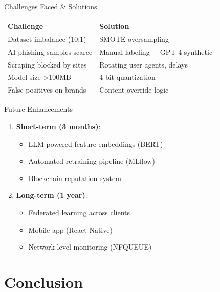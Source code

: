 \documentclass[10pt, aspectratio=169]{beamer}
\begin{document}
\begin{frame}{Challenges Faced \& Solutions}
    \begin{table}
        \centering
        \begin{tabular}{@{}p{3cm}p{4cm}@{}}
            \toprule
            \textbf{Challenge} & \textbf{Solution} \\
            \midrule
            Dataset imbalance (10:1) & SMOTE oversampling \\
            AI phishing samples scarce & Manual labeling + GPT-4 synthetic \\
            Scraping blocked by sites & Rotating user agents, delays \\
            Model size >100MB & 4-bit quantization \\
            False positives on brands & Content override logic \\
            \bottomrule
        \end{tabular}
    \end{table}
\end{frame}

\begin{frame}{Future Enhancements}
    \begin{enumerate}
        \item \textbf{Short-term (3 months)}:
        \begin{itemize}
            \item LLM-powered feature embeddings (BERT)
            \item Automated retraining pipeline (MLflow)
            \item Blockchain reputation system
        \end{itemize}
        \item \textbf{Long-term (1 year)}:
        \begin{itemize}
            \item Federated learning across clients
            \item Mobile app (React Native)
            \item Network-level monitoring (NFQUEUE)
        \end{itemize}
    \end{enumerate}
\end{frame}

\section{Conclusion}
\end{document}
